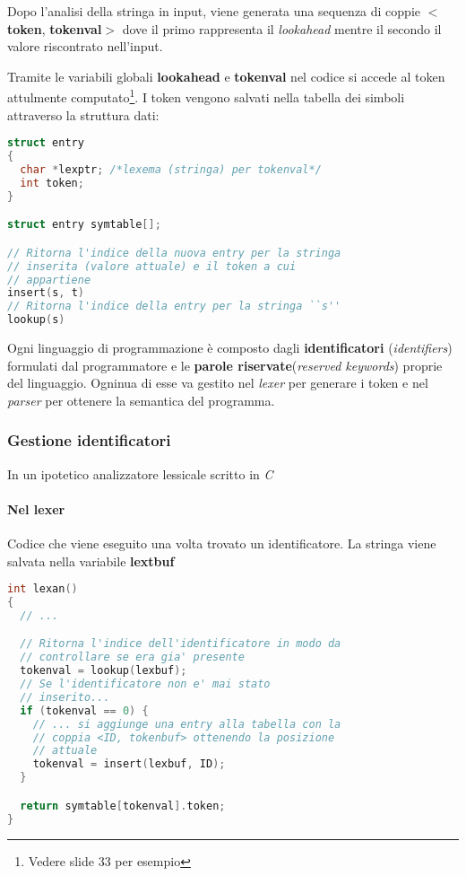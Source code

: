 Dopo l'analisi della stringa in input, viene generata una sequenza di coppie
$<$\textbf{token}, \textbf{tokenval}$>$ dove il primo rappresenta il
\textit{lookahead} mentre il secondo il valore riscontrato nell'input.

Tramite le variabili globali \textbf{lookahead} e \textbf{tokenval} nel codice
si accede al token attulmente computato\footnote{Vedere slide 33 per esempio}.
I token vengono salvati nella tabella dei simboli attraverso la struttura dati:

\begin{lstlisting}[language=C]
struct entry
{
  char *lexptr; /*lexema (stringa) per tokenval*/
  int token;
}

struct entry symtable[];

// Ritorna l'indice della nuova entry per la stringa
// inserita (valore attuale) e il token a cui
// appartiene
insert(s, t)
// Ritorna l'indice della entry per la stringa ``s''
lookup(s)
\end{lstlisting}

Ogni linguaggio di programmazione è composto dagli \textbf{identificatori}
(\textit{identifiers}) formulati dal programmatore e le
\textbf{parole riservate}(\textit{reserved keywords}) proprie del linguaggio.
Ogninua di esse va gestito nel \textit{lexer} per generare i token e nel
\textit{parser} per ottenere la semantica del programma.

\subsubsection{Gestione identificatori}
In un ipotetico analizzatore lessicale scritto in \textit{C}
\paragraph{Nel lexer}
Codice che viene eseguito una volta trovato un identificatore. La stringa viene
salvata nella variabile \textbf{lextbuf}

\begin{lstlisting}[language=C]
int lexan()
{
  // ...

  // Ritorna l'indice dell'identificatore in modo da
  // controllare se era gia' presente
  tokenval = lookup(lexbuf);
  // Se l'identificatore non e' mai stato
  // inserito...
  if (tokenval == 0) {
    // ... si aggiunge una entry alla tabella con la
    // coppia <ID, tokenbuf> ottenendo la posizione
    // attuale
    tokenval = insert(lexbuf, ID);
  }

  return symtable[tokenval].token;
}
\end{lstlisting}

